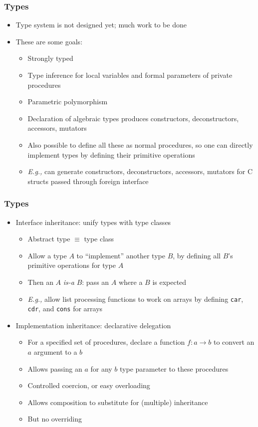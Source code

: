 \documentclass[12pt]{beamer}
\begin{document}
\begin{frame}[fragile]
\frametitle{Types}
\begin{itemize}
\item Type system is not designed yet; much work to be done
\item These are some goals:
  \begin{itemize}
  \item Strongly typed
  \item Type inference for local variables and formal parameters of
    private procedures
  \item Parametric polymorphism
  \item Declaration of algebraic types produces constructors,
    deconstructors, accessors, mutators
  \item Also possible to define all these as normal procedures, so one
    can directly implement types by defining their primitive
    operations
  \item \emph{E.g.,} can generate  constructors, deconstructors,
    accessors, mutators for C structs passed through foreign interface
  \end{itemize}
\end{itemize}
\end{frame}


\begin{frame}[fragile]
\frametitle{Types}
\begin{itemize}
\item Interface inheritance: unify types with type classes
  \begin{itemize}
  \item Abstract type $\equiv$ type class
  \item Allow a type $A$ to ``implement'' another type $B$, by
    defining all $B$'s primitive operations for type $A$
  \item Then an $A$ \emph{is-a} $B$: pass an $A$ where a $B$ is expected
  \item \emph{E.g.,} allow list processing functions to work on arrays
  by defining \texttt{car}, \texttt{cdr}, and \texttt{cons} for arrays
\end{itemize}
\item Implementation inheritance: declarative delegation
  \begin{itemize}
  \item For a specified set of procedures, 
    declare a function $f: a \to b$ to convert an $a$ argument to a $b$
  \item Allows passing an $a$ for any $b$ type parameter to these procedures
  \item Controlled coercion, or easy overloading
  \item Allows composition to substitute for (multiple) inheritance
  \item But no overriding
  \end{itemize}
\end{itemize}
\end{frame}
\end{document}
